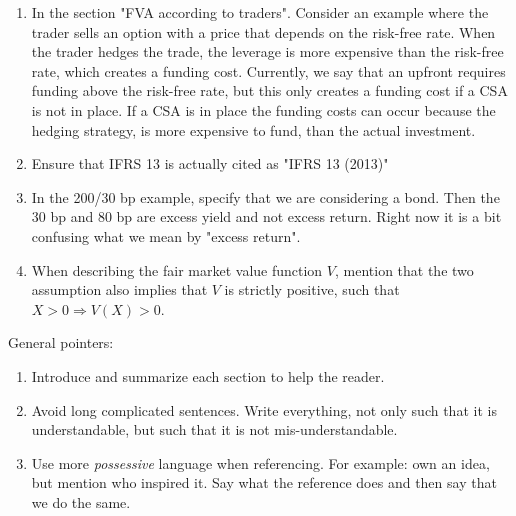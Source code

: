 \documentclass[10pt,a4paper]{article}
\begin{document}
\begin{enumerate}
            \item In the section "FVA according to traders".
                Consider an example where the trader sells an option with a price that depends on the risk-free rate. 
                When the trader hedges the trade, the leverage is more expensive than the risk-free rate, which creates a funding cost. 
                Currently, we say that an upfront requires funding above the risk-free rate,
                but this only creates a funding cost if a CSA is not in place.
                If a CSA is in place the funding costs can occur because the hedging strategy,
                is more expensive to fund, than the actual investment.
            \item Ensure that IFRS 13 is actually cited as "IFRS 13 (2013)"
            \item In the 200/30 bp example, specify that we are considering a bond.
                Then the 30 bp and 80 bp are excess yield and not excess return. 
                Right now it is a bit confusing what we mean by "excess return".
            \item When describing the fair market value function $V$,
                mention that the two assumption also implies that $V$ is strictly positive,
                such that $X>0 \Rightarrow V(X) > 0$.
        \end{enumerate}

        General pointers:
        \begin{enumerate}
            \item Introduce and summarize each section to help the reader.
            \item Avoid long complicated sentences. 
                Write everything, not only such that it is understandable,
                but such that it is not mis-understandable.
            \item Use more \textit{possessive} language when referencing. For example: own an idea, but mention who inspired it.
                Say what the reference does and then say that we do the same.
        \end{enumerate}
\end{document}
